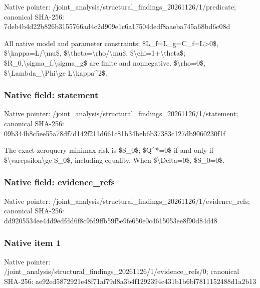 \documentclass[10pt,a4paper]{article}
\begin{document}
Native pointer: /joint\_analysis/structur\allowbreak{}al\_findings\_20261126/1/p\allowbreak{}redicate; canonical SHA-256: 7deb4b4d22b826b3155766ad\allowbreak{}4c2d909e1c6a17504dedf8aa\allowbreak{}eba745a68bd6c08d


All native model and parameter constraints; \$L\_f=L\_g=C\_f=L>0\$, \$\textbackslash{}kappa=L/\textbackslash{}mu\$, \$\textbackslash{}theta=\textbackslash{}rho/\textbackslash{}mu\$, \$\textbackslash{}chi=1+\textbackslash{}theta\$; \$R\_0,\textbackslash{}sigma\_f,\textbackslash{}sigma\_g\$ are finite and nonnegative. \$\textbackslash{}rho=0\$, \$\textbackslash{}Lambda\_\textbackslash{}Phi\textbackslash{}ge L\textbackslash{}kappa\textasciicircum{}2\$.


\subsubsection{Native field: statement}


Native pointer: /joint\_analysis/structur\allowbreak{}al\_findings\_20261126/1/s\allowbreak{}tatement; canonical SHA-256: 09b344b8c5ee55a78df7d142\allowbreak{}f211d661c81b34beb6b37383\allowbreak{}c127db9060230f1f


The exact zeroquery minimax risk is \$S\_0\$; \$Q\textasciicircum{}*=0\$ if and only if \$\textbackslash{}varepsilon\textbackslash{}ge S\_0\$, including equality. When \$\textbackslash{}Delta=0\$, \$S\_0=0\$.


\subsubsection{Native field: evidence\_refs}


Native pointer: /joint\_analysis/structur\allowbreak{}al\_findings\_20261126/1/e\allowbreak{}vidence\_refs; canonical SHA-256: dd9205534ee44d9edfdd6f8c\allowbreak{}9fd9ffb59f5e9fe650e0c461\allowbreak{}5053ee8f90d84d48



\subsubsection{Native item 1}


Native pointer: /joint\_analysis/structur\allowbreak{}al\_findings\_20261126/1/e\allowbreak{}vidence\_refs/0; canonical SHA-256: ae92ed5872921e48f71af79d\allowbreak{}8a3b4f1292394c431b1b6bf7\allowbreak{}811152488d1a2b13
\end{document}
